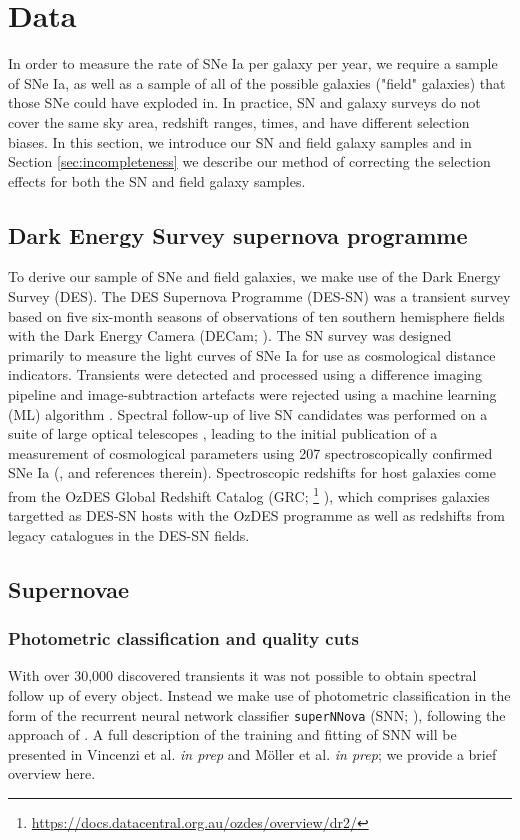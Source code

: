 \documentclass[fleqn,usenatbib]{mnras}
\begin{document}
\section{Data}

In order to measure the rate of SNe Ia per galaxy per year, we require a sample of SNe Ia, as well as a sample of all of the possible galaxies ("field" galaxies) that those SNe could have exploded in. In practice, SN and galaxy surveys do not cover the same sky area, redshift ranges, times, and have different selection biases. In this section, we introduce our SN and field galaxy samples and in Section \ref{sec:incompleteness} we describe our method of correcting the selection effects for both the SN and field galaxy samples.

\label{sec:data}
\subsection{Dark Energy Survey supernova programme \label{subsec:des}}
To derive our sample of SNe and field galaxies, we make use of the Dark Energy Survey (DES). The DES Supernova Programme (DES-SN) was a transient survey based on five six-month seasons of observations of ten southern hemisphere fields with the Dark Energy Camera (DECam; \citealt{Flaugher2015}). The SN survey was designed primarily to measure the light curves of SNe Ia for use as cosmological distance indicators. Transients were detected and processed using a difference imaging pipeline \citep{Kessler2015} and image-subtraction artefacts were rejected using a machine learning (ML) algorithm \citep{Goldstein2015}. Spectral follow-up of live SN candidates was performed on a suite of large optical telescopes \citep{Smith2020a}, leading to the initial publication of a measurement of cosmological parameters using 207 spectroscopically confirmed SNe Ia (\citealt{DESCollaboration2018a}, and references therein). Spectroscopic redshifts for host galaxies come from the OzDES Global Redshift Catalog (GRC; \footnote{\url{https://docs.datacentral.org.au/ozdes/overview/dr2/}} \citealt{Yuan2015,Childress2017,Lidman2020}), which comprises galaxies targetted as DES-SN hosts with the OzDES programme as well as redshifts from legacy catalogues in the DES-SN fields.
\subsection{Supernovae \label{subsec:host_sample}}
\subsubsection{Photometric classification and quality cuts \label{subsubsec:sn_classify}}
With over 30,000 discovered transients it was not possible to obtain spectral follow up of every object. Instead we make use of photometric classification in the form of the recurrent neural network classifier \texttt{superNNova} (SNN; \citealt{Moller2019}), following the approach of \citet{Scolnic2020}. A full description of the training and fitting of SNN will be presented in Vincenzi et al. \textit{in prep} and M\"{o}ller et al. \textit{in prep}; we provide a brief overview here.
\end{document}
